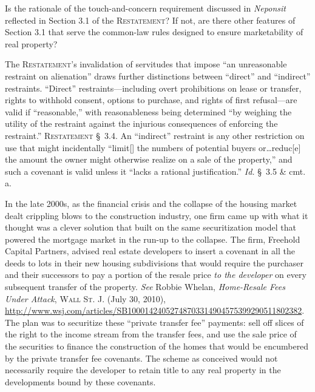 
\item Is the rationale of the touch-and-concern requirement discussed in
\textit{Neponsit} reflected in Section 3.1 of the \textsc{Restatement}? If not,
are there
other features of Section 3.1 that serve the common-law rules designed to ensure
marketability of real property?

\item The \textsc{Restatement}'s invalidation of servitudes that impose ``an
unreasonable
restraint on alienation'' draws further distinctions between ``direct'' and
``indirect'' restraints. ``Direct'' restraints---including overt prohibitions on
lease or transfer, rights to withhold consent, options to purchase, and rights
of first refusal---are valid if ``reasonable,'' with reasonableness being
determined ``by weighing the utility of the restraint against the injurious
consequences of enforcing the restraint.'' \textsc{Restatement} \S~3.4. An
``indirect'' restraint is any other restriction on use that might incidentally
``limit[] the numbers of potential buyers or\ldots reduc[e] the amount the owner
might otherwise realize on a sale of the property,'' and such a covenant is
valid unless it ``lacks a rational justification.'' \textit{Id.} \S~3.5 \& cmt.
a.

\item In the late 2000s, as the financial crisis and the collapse of the housing
market dealt crippling blows to the construction industry, one firm came up with
what it thought was a clever solution that built on the same securitization
model that powered the mortgage market in the run-up to the collapse. The firm,
Freehold Capital Partners, advised real estate developers to insert a covenant
in all the deeds to lots in their new housing subdivisions that would require
the purchaser and their successors to pay a portion of the resale price
\textit{to the developer} on every subsequent transfer of the property.
\textit{See} Robbie Whelan, \textit{Home-Resale Fees Under Attack}, \textsc{Wall
St. J}. (July 30, 2010),
\url{http://www.wsj.com/articles/SB10001424052748703314904575399290511802382}.
The plan was to securitize these ``private transfer fee'' payments: sell off
slices of the right to the income stream from the transfer fees, and use the
sale price of the securities to finance the construction of the homes that would
be encumbered by the private transfer fee covenants. The scheme as conceived
would not necessarily require the developer to retain title to any real property
in the developments bound by these covenants.


